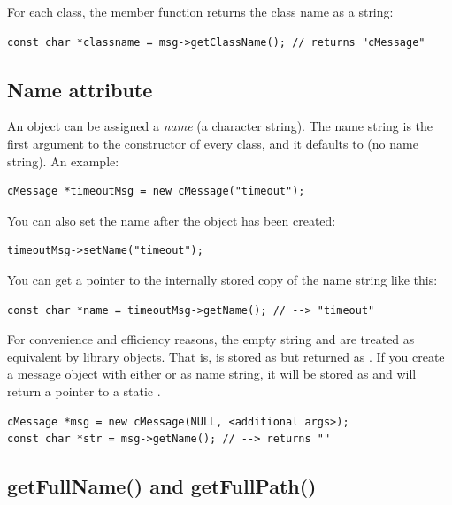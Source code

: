 For each class, the  member function returns the class
name as a string:

\begin{verbatim}
const char *classname = msg->getClassName(); // returns "cMessage"
\end{verbatim}


\subsection{Name attribute}
\label{sec:sim-lib:name}

An object can be assigned a \textit{name} (a character string). The name
string is the first argument to the constructor of every class,
and it defaults to  (no name string). An example:

\begin{verbatim}
cMessage *timeoutMsg = new cMessage("timeout");
\end{verbatim}

You can also set the name after the object has been created:

\begin{verbatim}
timeoutMsg->setName("timeout");
\end{verbatim}

You can get a pointer to the internally stored copy of the name
string like this:

\begin{verbatim}
const char *name = timeoutMsg->getName(); // --> "timeout"
\end{verbatim}

For convenience and efficiency reasons, the empty string 
and  are treated as equivalent by library objects.
That is,  is stored as  but returned as .
If you create a message object with either 
or  as name string, it will be stored as 
and  will return a pointer to a static .

\begin{verbatim}
cMessage *msg = new cMessage(NULL, <additional args>);
const char *str = msg->getName(); // --> returns ""
\end{verbatim}


\subsection{getFullName() and getFullPath()}
\label{sec:sim-lib:fullname-and-fullpath}


